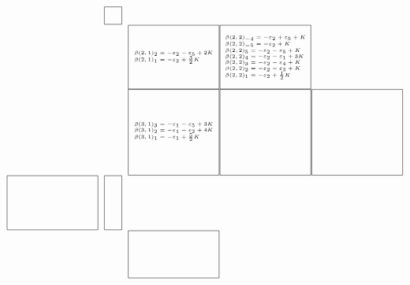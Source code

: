 \documentclass[11pt]{article}
\theoremstyle{plain}
\theoremstyle{definition}
\theoremstyle{remark}
\numberwithin{equation}{section}
\newcounter{r}
\newcounter{s}
\begin{document}
\begin{figure}[h]
$$
\begin{matrix}
\begin{tikzpicture}[scale = 0.65]
\foreach \x\y in {1/0}{
    \draw[thin] (\y+0.025, -\x-0.025) rectangle (0.975+\y, -\x-.975);
    \draw (0.5+\y,-\x-0.5) node (\x\y) {};
}
\foreach \x\y in {2/1, 2/2}{
    \draw[thin] (5*\y+0.025 + 0.3 - 4, 10-6*\x-0.025) rectangle (4.975+5*\y + 0.3 - 4, 10-6*\x-3.5);
    \draw (2.5+5*\y + 0.3 - 4,10-6*\x-1.75) node (\x\y) {};
}
\foreach \x\y in {3/1, 3/2, 3/3}{
    \draw[thin] (5*\y+0.025 + 0.3 - 4, 18.5-8*\x-0.025) rectangle (4.975+5*\y + 0.3 - 4, 18.5-8*\x-4.7);
    \draw (2.5+5*\y + 0.3 - 4,18.5-8*\x-2.3) node (\x\y) {};
}
\foreach \x\y in {4/0}{
    \draw[thin] (\y+0.025, 9.8-5*\x-0.025) rectangle (0.975+\y, 9.8-5*\x-2.975);
    \draw (0.5+\y,9.8-5*\x-2) node (\x\y) {};
}
\foreach \x\y in {4/-1}{
    \draw[thin] (5*\y+0.025-0.3, 9.8-5*\x-0.025) rectangle (4.975+5*\y-0.3, 9.8-5*\x-2.975);
    \draw (2.5+5*\y-0.3,9.8-5*\x-1.5) node (\x\y) {};
}
\foreach \x\y in {5/1}{
    \draw[thin] (5*\y+0.025 + 0.3 - 4, 9.3-4.5*\x-0.025) rectangle (4.975+5*\y + 0.3 - 4, 9.3-4.5*\x-2.6);
    \draw (2.5+5*\y + 0.3 - 4,9.3-4.5*\x-1.35) node (\x\y) {};
}
\node at (21) {\tiny$\begin{array}{l}
\beta(2,1)_{2} =   -\varepsilon_{2}-\varepsilon_5 + 2K \\
\beta(2,1)_{1} =   -\varepsilon_{2}+\frac{3}{2} K 
\end{array}$};
\node at (22) {\tiny$\begin{array}{l}
\beta(2,2)_{-4} =  -\varepsilon_{2}+\varepsilon_5+K  \\
\beta(2,2)_{-5} =  -\varepsilon_{2}+K \\
\beta(2,2)_{5} =  -\varepsilon_{2}-\varepsilon_5+K \\
\beta(2,2)_{4} =  -\varepsilon_{2}-\varepsilon_{1}+3K \\
\beta(2,2)_{3} =  -\varepsilon_{2}-\varepsilon_{4}+K \\
\beta(2,2)_{2} =  -\varepsilon_{2}-\varepsilon_3+K \\
\beta(2,2)_{1} =  -\varepsilon_{2}+\frac{1}{2} K 
\end{array}$};
\node at (31) {\tiny$\begin{array}{l}
\beta(3,1)_{3} =  -\varepsilon_{1}-\varepsilon_5+3K \\
\beta(3,1)_{2} =  -\varepsilon_{1}-\varepsilon_{2}+4K \\
\beta(3,1)_{1} =  -\varepsilon_{1}+\frac52 K 
\end{array}$};

\end{tikzpicture}
\end{matrix}$$
\end{figure}
\end{document}
